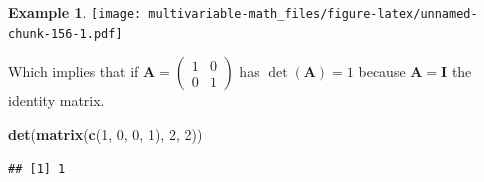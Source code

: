 \documentclass[
]{book}
\newenvironment{Shaded}{\begin{snugshade}}{\end{snugshade}}
\newcommand{\DecValTok}[1]{\textcolor[rgb]{0.00,0.00,0.81}{#1}}
\newcommand{\KeywordTok}[1]{\textcolor[rgb]{0.13,0.29,0.53}{\textbf{#1}}}
\newcommand{\NormalTok}[1]{#1}
\theoremstyle{definition}
\theoremstyle{definition}
\newtheorem{example}{Example}[chapter]
\theoremstyle{definition}
\theoremstyle{definition}
\theoremstyle{remark}
\begin{document}
\begin{example}
\texttt{[image: multivariable-math\_files/figure-latex/unnamed-chunk-156-1.pdf]}

Which implies that if \(\mathbf{A} = \begin{pmatrix} 1 & 0 \\ 0 & 1 \end{pmatrix}\) has \(\det(\mathbf{A}) = 1\) because \(\mathbf{A} = \mathbf{I}\) the identity matrix.

\begin{Shaded}
\begin{Highlighting}[]
\KeywordTok{det}\NormalTok{(}\KeywordTok{matrix}\NormalTok{(}\KeywordTok{c}\NormalTok{(}\DecValTok{1}\NormalTok{, }\DecValTok{0}\NormalTok{, }\DecValTok{0}\NormalTok{, }\DecValTok{1}\NormalTok{), }\DecValTok{2}\NormalTok{, }\DecValTok{2}\NormalTok{))}
\end{Highlighting}
\end{Shaded}

\begin{verbatim}
## [1] 1
\end{verbatim}

\end{example}
\end{document}
